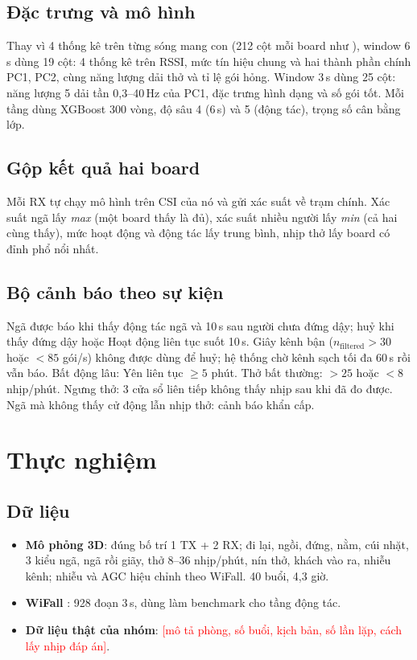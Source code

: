 \documentclass[conference]{IEEEtran}
\newcommand{\canlam}[1]{\textcolor{red}{[#1]}}
\begin{document}
\subsection{Đặc trưng và mô hình}
Thay vì 4 thống kê trên từng sóng mang con (212 cột mỗi board như \cite{natarajan2023}), window 6\,s dùng 19 cột: 4
thống kê trên RSSI, mức tín hiệu chung và hai thành phần chính PC1, PC2, cùng năng lượng dải thở và tỉ lệ gói hỏng.
Window 3\,s dùng 25 cột: năng lượng 5 dải tần 0,3–40\,Hz của PC1, đặc trưng hình dạng và số gói tốt. Mỗi tầng dùng
XGBoost 300 vòng, độ sâu 4 (6\,s) và 5 (động tác), trọng số cân bằng lớp.

\subsection{Gộp kết quả hai board}
Mỗi RX tự chạy mô hình trên CSI của nó và gửi xác suất về trạm chính. Xác suất ngã lấy \emph{max} (một board thấy là
đủ), xác suất nhiều người lấy \emph{min} (cả hai cùng thấy), mức hoạt động và động tác lấy trung bình, nhịp thở lấy
board có đỉnh phổ nổi nhất.

\subsection{Bộ cảnh báo theo sự kiện}
Ngã được báo khi thấy động tác ngã và 10\,s sau người chưa đứng dậy; huỷ khi thấy đứng dậy hoặc Hoạt động liên tục suốt
10\,s. Giây kênh bận ($n_\text{filtered} > 30$ hoặc $< 85$ gói/s) không được dùng để huỷ; hệ thống chờ kênh sạch tối đa
60\,s rồi vẫn báo. Bất động lâu: Yên liên tục $\ge 5$ phút. Thở bất thường: $> 25$ hoặc $< 8$ nhịp/phút. Ngưng thở: 3
cửa sổ liên tiếp không thấy nhịp sau khi đã đo được. Ngã mà không thấy cử động lẫn nhịp thở: cảnh báo khẩn cấp.

\section{Thực nghiệm}
\subsection{Dữ liệu}
\begin{itemize}
  \item \textbf{Mô phỏng 3D}: đúng bố trí 1 TX + 2 RX; đi lại, ngồi, đứng, nằm, cúi nhặt, 3 kiểu ngã, ngã rồi giãy, thở
    8–36 nhịp/phút, nín thở, khách vào ra, nhiễu kênh; nhiễu và AGC hiệu chỉnh theo WiFall. 40 buổi, 4,3 giờ.
  \item \textbf{WiFall} \cite{wifall}: 928 đoạn 3\,s, dùng làm benchmark cho tầng động tác.
  \item \textbf{Dữ liệu thật của nhóm}: \canlam{mô tả phòng, số buổi, kịch bản, số lần lặp, cách lấy nhịp đáp án}.
\end{itemize}
\end{document}
